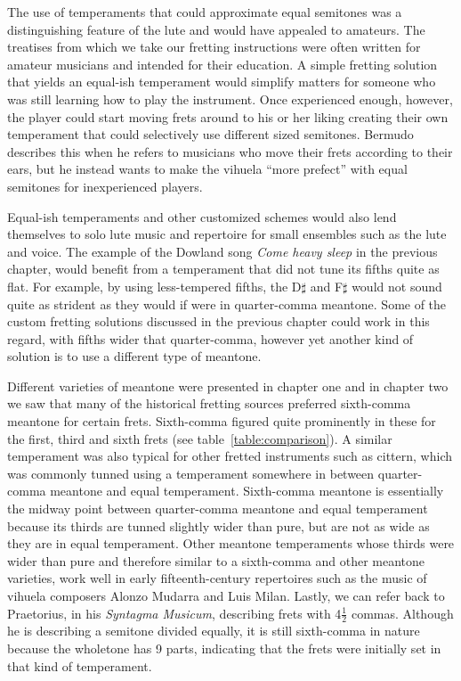 The use of temperaments that could approximate equal semitones was a distinguishing
feature of the lute and would have appealed to amateurs. The treatises from which we
take our fretting instructions were often written for amateur musicians and intended
for their education. A simple fretting solution that yields an equal-ish temperament
would simplify matters for someone who was still learning how to play the instrument.
Once experienced enough, however, the player could start moving frets around to his or
her liking creating their own temperament that could selectively use different sized
semitones. Bermudo describes this when he refers to musicians who move their
frets according to their ears, but he instead wants to make the vihuela ``more
prefect'' with equal semitones for inexperienced players.\autocite[78]{DE:1}

Equal-ish temperaments and other customized schemes would also lend themselves to solo
lute music and repertoire for small ensembles such as the lute and voice. The example
of the Dowland song \textit{Come heavy sleep} in the previous chapter, would benefit
from a temperament that did not tune its fifths quite as flat.  For example, by using
less-tempered fifths, the D$\sharp$ and F$\sharp$ would not sound quite as strident as
they would if were in quarter-comma meantone. Some of the custom fretting solutions
discussed in the previous chapter could work in this regard, with fifths wider that
quarter-comma, however yet another kind of solution is to use a different type of
meantone.

Different varieties of meantone were presented in chapter one and in chapter two we saw
that many of the historical fretting sources preferred sixth-comma meantone for certain
frets.   Sixth-comma figured quite prominently in these for the first, third and sixth
frets (see table~\ref{table:comparison}). A similar temperament was also typical for
other fretted instruments such as cittern, which was commonly tunned using a
temperament somewhere in between quarter-comma meantone and equal temperament.
\autocite[12]{PF:1}  Sixth-comma meantone is essentially the midway point between
quarter-comma meantone and equal temperament because its thirds are tunned slightly
wider than pure, but are not as wide as they are in equal temperament. Other meantone
temperaments whose thirds were wider than pure and therefore similar to a sixth-comma
and other meantone varieties, work well in early fifteenth-century repertoires such as
the music of vihuela composers Alonzo Mudarra and Luis Milan.\autocite[56]{WH:1}
Lastly, we can refer back to Praetorius, in his \textit{Syntagma Musicum}, describing
frets with 4$ \frac{1}{2} $ commas.\autocite[68]{MP:1} Although he is describing a
semitone divided equally, it is still sixth-comma in nature because the wholetone has 9
parts, indicating that the frets were initially set in that kind of temperament.

